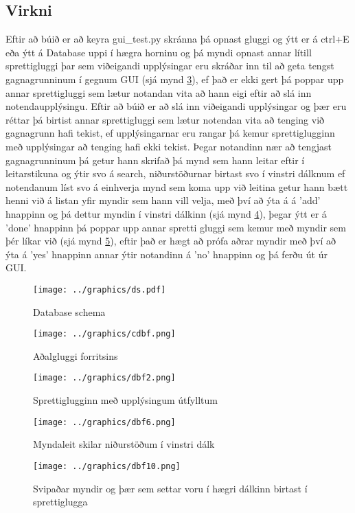 \documentclass[12pt, git, draft]{rureport}
\begin{document}
\subsection {Virkni}
Eftir að búið er að keyra gui\_test.py skránna þá opnast gluggi og ýtt er á ctrl+E eða ýtt á Database uppi í hægra horninu og þá myndi opnast annar lítill sprettigluggi þar sem viðeigandi upplýsingar eru skráðar inn til að geta tengst gagnagrunninum í gegnum GUI (sjá mynd \ref{fig:dbf2}), ef það er ekki gert þá poppar upp annar sprettigluggi sem lætur notandan vita að hann eigi eftir að slá inn notendaupplýsingu.
\newline
\newline
Eftir að búið er að slá inn viðeigandi upplýsingar og þær eru réttar þá birtist annar sprettigluggi sem lætur notendan vita að tenging við gagnagrunn hafi tekist, ef upplýsingarnar eru rangar þá kemur sprettiglugginn með upplýsingar að tenging hafi ekki tekist.
\newline
\newline
Þegar notandinn nær að tengjast gagnagrunninum þá getur hann skrifað þá mynd sem hann leitar eftir í leitarstikuna og ýtir svo á search, niðurstöðurnar birtast svo í vinstri dálknum ef notendanum líst svo á einhverja mynd sem koma upp við leitina  getur hann bætt henni við á listan yfir myndir sem hann vill velja, með því að ýta á á 'add' hnappinn og þá dettur myndin í vinstri dálkinn (sjá mynd \ref{fig:dbf6}), þegar ýtt er á 'done' hnappinn þá poppar upp annar spretti gluggi sem kemur með myndir sem þér líkar við (sjá mynd \ref{fig:dbf10}), eftir það er hægt að prófa aðrar myndir með því að ýta á 'yes' hnappinn annar ýtir notandinn á 'no' hnappinn og þá ferðu út úr GUI.

\pagebreak
\begin{figure}
	\centering 
	\texttt{[image: ../graphics/ds.pdf]}
	\caption{Database schema \label{fig:dataschema}}
\end{figure}

\begin{figure}
	\centering 
	\texttt{[image: ../graphics/cdbf.png]}
	\caption{Aðalgluggi forritsins \label{fig:cdbf}}
\end{figure}

\begin{figure}
	\centering 
	\texttt{[image: ../graphics/dbf2.png]}
	\caption{ Sprettiglugginn með upplýsingum útfylltum \label{fig:dbf2}}
\end{figure}


\begin{figure}
	\centering 
	\texttt{[image: ../graphics/dbf6.png]}
	\caption{Myndaleit skilar niðurstöðum í vinstri dálk\label{fig:dbf6}}
\end{figure}

\begin{figure}
	\centering 
	\texttt{[image: ../graphics/dbf10.png]}
	\caption{Svipaðar myndir og þær sem settar voru í hægri dálkinn birtast í sprettiglugga\label{fig:dbf10}}
\end{figure}

\clearpage
\printbibliography
\end{document}

